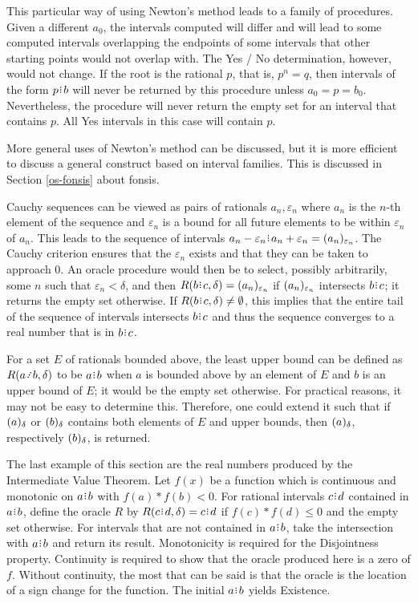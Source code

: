 \documentclass[12pt]{article}
\begin{document}
This particular way of using Newton's method leads to a family of procedures. Given a different $a_0$, the intervals computed will differ and will lead to some computed intervals overlapping the endpoints of some intervals that other starting points would not overlap with. The Yes / No determination, however, would not  change. If the root is the rational $p$, that is, $p^n = q$,  then intervals of the form $p\rint b$ will never be returned by this procedure unless $a_0 = p = b_0$. Nevertheless, the procedure will never return the empty set for an interval that contains $p$. All Yes intervals in this case will contain $p$. 

More general uses of Newton's method can be discussed, but it is more efficient to discuss a general construct based on interval families. This is discussed in Section \ref{os-fonsis} about fonsis. 

Cauchy sequences can be viewed as pairs of rationals $a_n, \varepsilon_n$ where $a_n$ is the $n$-th element of the sequence and $\varepsilon_n$ is a bound for all future elements to be within $\varepsilon_n$ of $a_n$. This leads to the sequence of intervals $a_n-\varepsilon_n\rint a_n+\varepsilon_n = \halo[ \varepsilon_n]{a_n}$. The Cauchy criterion ensures that the $\varepsilon_n$ exists and that they can be taken to approach 0. An oracle procedure would then be to select, possibly arbitrarily, some $n$ such that $\varepsilon_n < \delta$, and then  $R(b\rint c, \delta) = \halo[ \varepsilon_n]{a_n}$ if $\halo[\varepsilon_n]{a_n}$ intersects $b\rint c$; it returns the empty set otherwise. If $R(b\rint c, \delta) \neq \emptyset$, this implies that the entire tail of the sequence of intervals intersects $b\rint c$ and thus the sequence converges to a real number that is in $b\rint c$.  

For a set $E$ of rationals bounded above, the least upper bound can be defined as $R(a \lte b, \delta)$ to be $a\rint b$ when $a$ is bounded above by an element of $E$ and $b$ is an upper bound of $E$; it would be the empty set otherwise. For practical reasons, it may not be easy to determine this. Therefore, one could extend it such that if $\halo{a}$ or $\halo{b}$ contains both elements of $E$ and upper bounds, then $\halo{a}$, respectively $\halo{b}$, is returned. 

The last example of this section are the real numbers produced by the Intermediate Value Theorem. Let $f(x)$ be a function which is continuous and monotonic on $a\rint b$ with $f(a)*f(b) < 0$. For rational intervals $c\rint d$ contained in $a\rint b$, define the oracle $R$ by $R(c\rint d, \delta) = c\rint d$ if $f(c)*f(d) \leq 0$ and the empty set otherwise. For intervals that are not contained in $a\rint b$, take the intersection with $a\rint b$ and return its result. Monotonicity is required for the Disjointness property. Continuity is required to show that the oracle produced here is a zero of $f$. Without continuity, the most that can be said is that the oracle is the location of a sign change for the function. The initial $a\rint b$ yields Existence.
\end{document}
